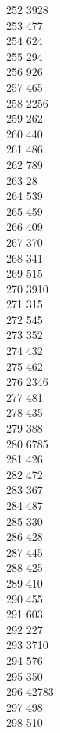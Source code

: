 { 252	3928 \\
 253	477 \\
 254	624 \\
 255	294 \\
 256	926 \\
 257	465 \\
 258	2256 \\
 259	262 \\
 260	440 \\
 261	486 \\
 262	789 \\
 263	28 \\
 264	539 \\
 265	459 \\
 266	409 \\
 267	370 \\
 268	341 \\
 269	515 \\
 270	3910 \\
 271	315 \\
 272	545 \\
 273	352 \\
 274	432 \\
 275	462 \\
 276	2346 \\
 277	481 \\
 278	435 \\
 279	388 \\
 280	6785 \\
 281	426 \\
 282	472 \\
 283	367 \\
 284	487 \\
 285	330 \\
 286	428 \\
 287	445 \\
 288	425 \\
 289	410 \\
 290	455 \\
 291	603 \\
 292	227 \\
 293	3710 \\
 294	576 \\
 295	350 \\
 296	42783 \\
 297	498 \\
 298	510 \\
}

